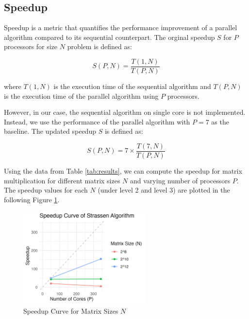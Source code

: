 \documentclass[12pt,a4paper]{article}
\begin{document}
\subsection{Speedup}
Speedup is a metric that quantifies the performance improvement of a parallel algorithm compared to its sequential counterpart. 
The orginal speedup \( S \) for \( P \) processors for size $N$ problem is defined as:

\begin{equation*}
    S(P, N) = \frac{T(1,N)}{T(P, N)}
\end{equation*}

where \( T(1,N) \) is the execution time of the sequential algorithm and 
 \( T(P, N) \) is the execution time of the parallel algorithm using \( P \) processors.

However, in our case, the sequential algorithm on single core is not implemented. Instead, 
 we use the performance of the parallel algorithm with \( P = 7 \) as the baseline.
The updated speedup \( S \) is defined as:

\begin{equation}
    \label{eqn:updated_speedup}
    S(P, N) = 7 \times \frac{T(7,N)}{T(P, N)}
\end{equation}


 Using the data from Table \ref{tab:results}, 
  we can compute the speedup for matrix multiplication for different 
  matrix sizes \( N \) and varying number of processors \( P \). 
The speedup values for each \( N \) (under level 2 and level 3) are plotted in the following Figure \ref{fig:speedup_curve}.

\begin{figure}
    \centering
    \includegraphics[width=0.6\textwidth]{speedup_curve.png}
    \caption{Speedup Curve for Matrix Sizes \( N \)}
    \label{fig:speedup_curve}
\end{figure}
    
\end{document}
